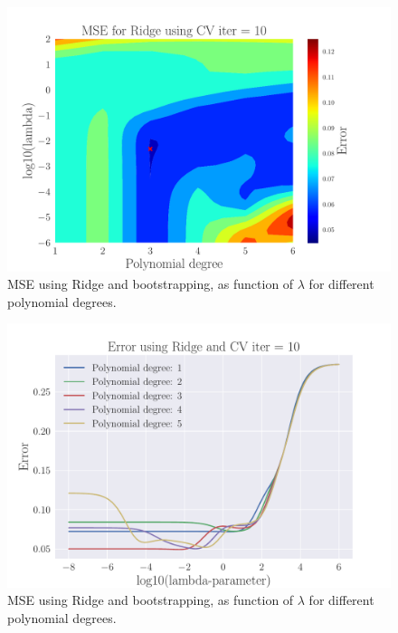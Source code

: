 \documentclass[reprint,english,notitlepage,aps,nobalancelastpage,nofootinbib]{revtex4-1}  %
\begin{document}
\begin{figure}[H]
	\includegraphics[width=\linewidth]{Contour_PL_Ridge_CV10_n30_eps0.2_p1_6_lmb2_m6.pdf}
	\caption{MSE using Ridge and bootstrapping, as function of $\lambda$ for different polynomial degrees.}
	\label{fig:Ridge_boot_BVT}
\end{figure}

\begin{figure}[H]
	\includegraphics[width=\linewidth]{lambdaMSE_Ridge_CV10_n30_eps02_p5_lm8_6.pdf}
	\caption{MSE using Ridge and bootstrapping, as function of $\lambda$ for different polynomial degrees.}
	\label{fig:Ridge_boot_BVT}
\end{figure}
\end{document}
